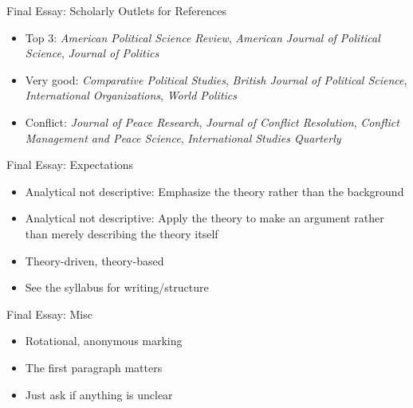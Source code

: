 \documentclass[handout]{beamer}
\begin{document}
\begin{frame}{Final Essay: Scholarly Outlets for References}
    \begin{itemize}
        \pause\item Top 3: \emph{American Political Science Review}, \emph{American Journal of Political Science}, \emph{Journal of Politics}
        \pause\item Very good: \emph{Comparative Political Studies}, \emph{British Journal of Political Science}, \emph{International Organizations}, \emph{World Politics}
        \pause\item Conflict: \emph{Journal of Peace Research}, \emph{Journal of Conflict Resolution}, \emph{Conflict Management and Peace Science}, \emph{International Studies Quarterly}
    \end{itemize}
\end{frame}

\begin{frame}{Final Essay: Expectations}
    \begin{itemize}
        \pause\item Analytical not descriptive: Emphasize the theory rather than the background
        \pause\item Analytical not descriptive: Apply the theory to make an argument rather than merely describing the theory itself
        \pause\item Theory-driven, theory-based
        \pause\item See the syllabus for writing/structure
    \end{itemize}
\end{frame}

\begin{frame}{Final Essay: Misc}
    \begin{itemize}
        \pause\item Rotational, anonymous marking
        \pause\item The first paragraph matters
        \pause\item Just ask if anything is unclear
    \end{itemize}
\end{frame}
\end{document}
